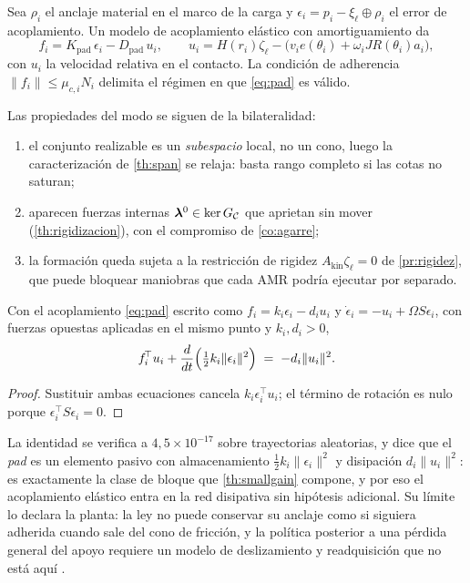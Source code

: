 Sea $\rho_i$ el anclaje material en el marco de la carga y
$\epsilon_i=p_i-\xi_\ell\oplus\rho_i$ el error de acoplamiento. Un modelo de
acoplamiento elástico con amortiguamiento da
\begin{equation}
  f_i=K_{\mathrm{pad}}\,\epsilon_i-D_{\mathrm{pad}}\,u_i,
  \qquad
  u_i=H(r_i)\zeta_\ell-\bigl(v_ie(\theta_i)+\omega_iJR(\theta_i)a_i\bigr),
  \label{eq:pad}
\end{equation}
con $u_i$ la velocidad relativa en el contacto. La condición de adherencia
$\|f_i\|\le\mu_{c,i}N_i$ delimita el régimen en que \eqref{eq:pad} es válido.

Las propiedades del modo se siguen de la bilateralidad:
\begin{enumerate}[leftmargin=1.9em,topsep=0.2em,itemsep=0.2em]
  \item el conjunto realizable es un \emph{subespacio} local, no un cono, luego
  la caracterización de \cref{th:span} se relaja: basta rango completo si las
  cotas no saturan;
  \item aparecen fuerzas internas $\bm\lambda^{0}\in\ker G_{\mathcal{C}}$ que aprietan
  sin mover (\cref{th:rigidizacion}), con el compromiso de
  \cref{co:agarre};
  \item la formación queda sujeta a la restricción de rigidez
  $A_{\mathrm{kin}}\zeta_\ell=0$ de \cref{pr:rigidez}, que puede bloquear
  maniobras que cada AMR podría ejecutar por separado.
\end{enumerate}

\begin{proposicion}
\label{pr:pad-energia}
Con el acoplamiento \eqref{eq:pad} escrito como $f_i=k_i\epsilon_i-d_iu_i$ y
$\dot\epsilon_i=-u_i+\Omega S\epsilon_i$, con fuerzas opuestas aplicadas en el
mismo punto y $k_i,d_i>0$,
\[
  f_i^{\!\top}u_i+\frac{d}{dt}\Bigl(\tfrac12 k_i\lVert\epsilon_i\rVert^{2}\Bigr)
  \;=\;-d_i\lVert u_i\rVert^{2}.
\]
\end{proposicion}

\begin{proof}
Sustituir ambas ecuaciones cancela $k_i\epsilon_i^{\!\top}u_i$; el término de
rotación es nulo porque $\epsilon_i^{\!\top}S\epsilon_i=0$.
\end{proof}

\begin{observacion}
\label{obs:pad-pasivo}
La identidad se verifica a $4{,}5\times10^{-17}$ sobre trayectorias aleatorias, y
dice que el \emph{pad} es un elemento pasivo con almacenamiento
$\tfrac12k_i\lVert\epsilon_i\rVert^{2}$ y disipación $d_i\lVert u_i\rVert^{2}$: es
exactamente la clase de bloque que \cref{th:smallgain} compone, y por eso el
acoplamiento elástico entra en la red disipativa sin hipótesis adicional. Su
límite lo declara la planta: la ley no puede conservar su anclaje como si
siguiera adherida cuando sale del cono de fricción, y la política posterior a una
pérdida general del apoyo requiere un modelo de deslizamiento y readquisición que
no está aquí \cite{mayorga2026m1}.
\end{observacion}

